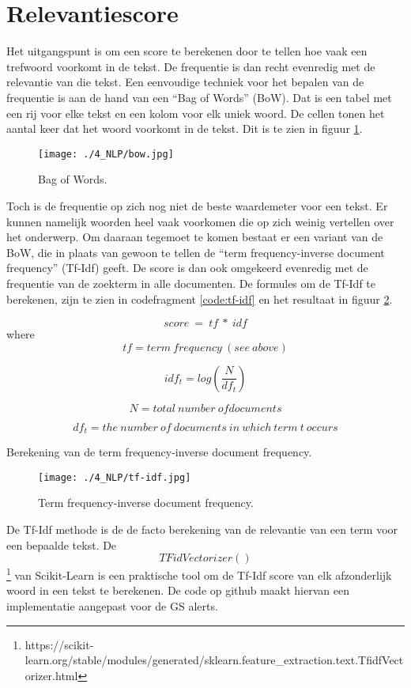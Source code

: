 \section{Relevantiescore}
Het uitgangspunt is om een score te berekenen door te tellen hoe vaak een trefwoord voorkomt in de tekst. De frequentie is dan recht evenredig met de relevantie van die tekst. Een eenvoudige techniek voor het bepalen van de frequentie is aan de hand van een ``Bag of Words'' (BoW). Dat is een tabel met een rij voor elke tekst en een kolom voor elk uniek woord. De cellen tonen het aantal keer dat het woord voorkomt in de tekst.  Dit is te zien in figuur \ref{fig:bow}.
\begin{figure}[h!]
    \centering
    \texttt{[image: ./4\_NLP/bow.jpg]}
    \caption[Bag of Words.]{\label{fig:bow}Bag of Words.}
\end{figure}
Toch is de frequentie op zich nog niet de beste waardemeter voor een tekst. Er kunnen namelijk woorden heel vaak voorkomen die op zich weinig vertellen over het onderwerp. Om daaraan tegemoet te komen bestaat er een variant van de BoW, die in plaats van gewoon te tellen de ``term frequency-inverse document frequency'' (Tf-Idf) geeft. De score is dan ook omgekeerd evenredig met de frequentie van de zoekterm in alle documenten. De formules om de Tf-Idf te berekenen, zijn te zien in codefragment \ref{code:tf-idf} en het resultaat in figuur \ref{fig:tf-idf}.
\begin{listing}[h!]
    \[
        score\ =\ tf\ \ast\ idf
    \]  
    where
    \[
        tf=term\ frequency\ \left(see\ above\right)
    \] 
    
    \[
        idf_t=log\left(\frac{N}{df_t}\right)
    \]  
    
    \[ 
        N=total\ number\ ofdocuments
    \]  
    
    \[ 
        df_t=the\ number\ of\ documents\ in\ which\ term\ t\ occurs
    \] 
     
    \caption[term frequency-inverse document frequency]{Berekening van de term frequency-inverse document frequency.}
    \label{code:tf-idf}
\end{listing}
\begin{figure}[h!]
    \centering
    \texttt{[image: ./4\_NLP/tf-idf.jpg]}
    \caption[term frequency-inverse document frequency.]{\label{fig:tf-idf}Term frequency-inverse document frequency.}
\end{figure}
De Tf-Idf methode is de de facto berekening van de relevantie van een term voor een bepaalde tekst. De \[TFidVectorizer()\] \footnote{https://scikit-learn.org/stable/modules/generated/sklearn.feature_extraction.text.TfidfVectorizer.html} van Scikit-Learn is een praktische tool om de Tf-Idf score van elk afzonderlijk woord in een tekst te berekenen. De code op github \textcite{Depaepenlp2025} maakt hiervan een implementatie aangepast voor de GS alerts.
